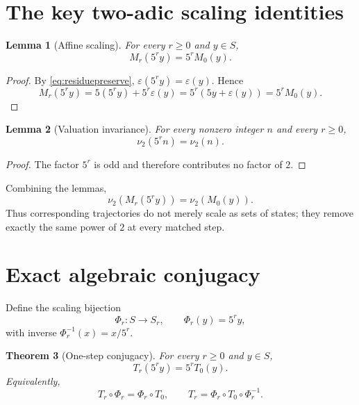 \documentclass[11pt]{article}
\newtheorem{theorem}{Theorem}[section]
\newtheorem{lemma}[theorem]{Lemma}
\theoremstyle{remark}
\newcommand{\vTwo}{\nu_2}
\newcommand{\eps}{\varepsilon}
\begin{document}
\section{The key two-adic scaling identities}

\begin{lemma}[Affine scaling]
For every $r\ge0$ and $y\in S$,
\begin{equation}
M_r(5^r y)=5^rM_0(y).
\label{eq:affinescale}
\end{equation}
\end{lemma}

\begin{proof}
By \eqref{eq:residuepreserve}, $\eps(5^r y)=\eps(y)$.  Hence
\[
M_r(5^r y)
=5(5^r y)+5^r\eps(y)
=5^r(5y+\eps(y))
=5^rM_0(y).
\]
\end{proof}

\begin{lemma}[Valuation invariance]
For every nonzero integer $n$ and every $r\ge0$,
\begin{equation}
\vTwo(5^r n)=\vTwo(n).
\label{eq:valscale}
\end{equation}
\end{lemma}

\begin{proof}
The factor $5^r$ is odd and therefore contributes no factor of $2$.
\end{proof}

Combining the lemmas,
\begin{equation}
\vTwo(M_r(5^r y))=\vTwo(M_0(y)).
\label{eq:matchedvaluation}
\end{equation}
Thus corresponding trajectories do not merely scale as sets of states; they remove exactly the same power of $2$ at every matched step.

\section{Exact algebraic conjugacy}

Define the scaling bijection
\[
\Phi_r:S\to S_r,\qquad \Phi_r(y)=5^r y,
\]
with inverse $\Phi_r^{-1}(x)=x/5^r$.

\begin{theorem}[One-step conjugacy]
For every $r\ge0$ and $y\in S$,
\begin{equation}
T_r(5^r y)=5^rT_0(y).
\label{eq:onestep}
\end{equation}
Equivalently,
\[
T_r\circ\Phi_r=\Phi_r\circ T_0,
\qquad
T_r=\Phi_r\circ T_0\circ\Phi_r^{-1}.
\]
\end{theorem}
\end{document}
